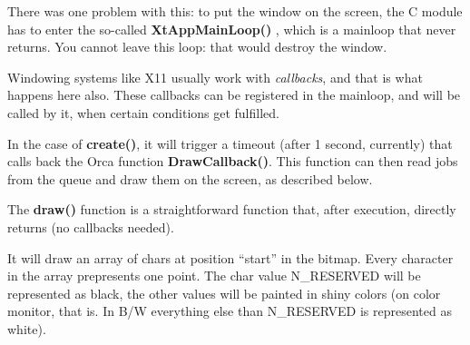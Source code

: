 There was one problem with this: to put the window on the screen, 
the C module has to enter the so-called {\bf XtAppMainLoop() }, which is
a mainloop that never returns. You cannot leave this loop: that would destroy
the window. 

Windowing systems like X11 usually work with {\em callbacks}, and that is what
happens here also. These callbacks can be registered in the mainloop, and will
be called by it, when certain conditions get fulfilled.

In the case of {\bf create()}, it will trigger a timeout (after 1 second,
currently) that calls back the Orca function {\bf DrawCallback()}.
This function can then read jobs from the queue and draw them on the screen,
as described below.



 \label{label:draw}

The {\bf draw()} function is a straightforward 
function that, after execution, directly returns (no callbacks needed). 

It will draw an array of chars at position ``start'' in the bitmap. 
Every character in the array prepresents one point. The char value N\_RESERVED
will be represented as black, the other values will be painted in shiny colors 
(on color monitor, that is. In B/W everything else than N\_RESERVED is 
represented as white).

